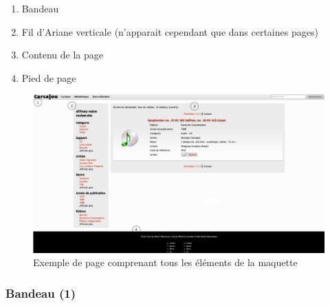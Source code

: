 \documentclass[letter, 11pt]{report}
\begin{document}
\begin{enumerate}
	\item Bandeau
	\item Fil d'Ariane verticale (n'apparait cependant que dans certaines pages)
	\item Contenu de la page
	\item Pied de page
\end{enumerate}

\begin{figure}[htbp]
	\begin{center}
		\includegraphics[scale=0.3]{pageType.png}
	\end{center}
	\caption{Exemple de page comprenant tous les éléments de la maquette}
\end{figure}

\subsubsection{Bandeau (1)}
\end{document}
